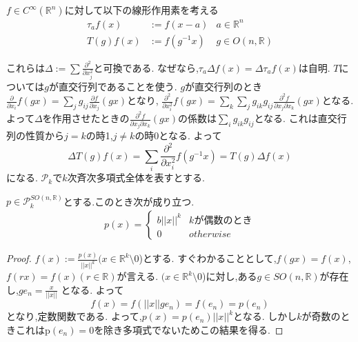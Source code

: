 \documentclass[uplatex]{jsbook}
\begin{document}
$f \in C^{\infty}(\mathbb{R}^n)$に対して以下の線形作用素を考える
\begin{align*}
\tau_{a}f(x) & := f(x-a) & a \in \mathbb{R}^n \\
T(g)f(x)    & := f(g^{-1}x)  & g \in O(n, \mathbb{R})
\end{align*}

これらは$\Delta:= \sum \frac{\partial^2}{\partial x_j^2}$と可換である.
なぜなら,$\tau_a \Delta f(x) = \Delta \tau_a f(x)$は自明.
$T$については$g$が直交行列であることを使う.
$g$が直交行列のとき
$\frac{\partial }{\partial x_i} f(gx) = \sum_j g_{ij} \frac{\partial f}{\partial x_j} (gx)$となり,
$\frac{\partial^2 }{\partial x_i^2} f(gx) = \sum_k \sum_j  g_{ik} g_{ij} \frac{\partial^2 f}{\partial x_j \partial x_k} (gx)$となる.
よって$\Delta$を作用させたときの$\frac{\partial^2 f}{\partial x_j \partial x_k} (gx)$の係数は$\sum_i g_{ik}g_{ij}$となる.
これは直交行列の性質から$j=k$の時1,$j\neq k$の時0となる.
よって
\begin{equation*}
   \Delta T(g) f(x) = \sum_i \frac{\partial^2}{\partial x_i^2}f(g^{-1}x) = T(g) \Delta f(x) 
\end{equation*}
になる.
$\mathcal{P}_k$で$k$次斉次多項式全体を表すとする.
\begin{prop}
$p \in \mathcal{P}_k^{SO(n, \mathbb{R})}$とする.このとき次が成り立つ.
\begin{align*}
    p(x) =   \begin{cases}
    b ||x||^k &  k \mbox{が偶数のとき} \\
    0 & otherwise
  \end{cases}
\end{align*}
\end{prop}
\begin{proof}
$f(x) := \frac{p(x)}{||x||^k}(x \in \mathbb{R}^k \setminus 0$)とする.
すぐわかることとして,$f(gx) = f(x)$, $f(rx) = f(x)(r \in \mathbb{R})$が言える.
$(x \in \mathbb{R}^k \setminus 0$)に対し,ある$g \in SO(n,\mathbb{R})$が存在し,$g e_n = \frac{x}{||x|| }$ となる.
よって
\begin{equation*}
    f(x) = f(||x|| ge_n)  = f(e_n) = p(e_n) 
\end{equation*}
となり,定数関数である.
よって,$p(x) =  p(e_n) || x||^k$となる.
しかし$k$が奇数のときこれはp$(e_n)=0$を除き多項式でないためこの結果を得る.
\end{proof}
\end{document}

